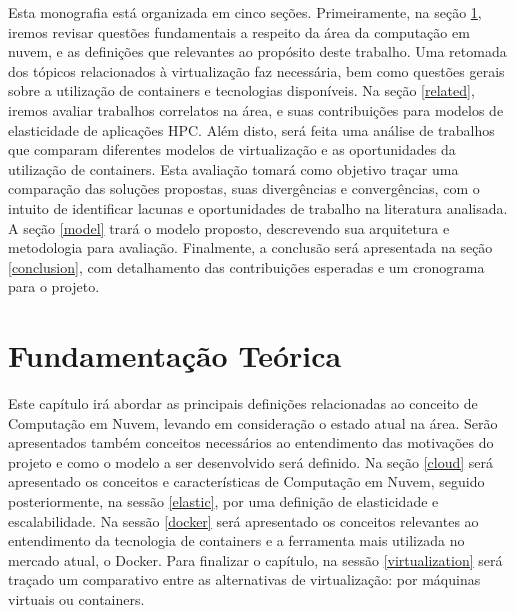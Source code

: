 \documentclass[twoside,english,brazilian]{UNISINOSartigo}
\begin{document}
Esta monografia está organizada em cinco seções. Primeiramente, na seção \ref{fundamentacao}, iremos revisar questões fundamentais a respeito da área da computação em nuvem, e as definições que relevantes ao propósito deste trabalho. Uma retomada dos tópicos relacionados à virtualização faz necessária, bem como questões gerais sobre a utilização de containers e tecnologias disponíveis. Na seção \ref{related}, iremos avaliar trabalhos correlatos na área, e suas contribuições para modelos de elasticidade de aplicações HPC. Além disto, será feita uma análise de trabalhos que comparam diferentes modelos de virtualização e as oportunidades da utilização de containers. Esta avaliação tomará como objetivo traçar uma comparação das soluções propostas, suas divergências e convergências, com o intuito de identificar lacunas e oportunidades
de trabalho na literatura analisada. A seção \ref{model} trará o modelo proposto, descrevendo sua arquitetura e metodologia para avaliação. Finalmente, a conclusão será apresentada na seção \ref{conclusion}, com detalhamento das contribuições esperadas e
um cronograma para o projeto.


\chapter{Fundamentação Teórica}
\label{fundamentacao}

Este capítulo irá abordar as principais definições relacionadas ao conceito de Computação em Nuvem, levando em consideração o estado atual na área. Serão apresentados também conceitos necessários ao entendimento das motivações do projeto e como o modelo a ser desenvolvido será definido. Na seção \ref{cloud} será apresentado os conceitos e características de Computação em Nuvem, seguido posteriormente, na sessão \ref{elastic}, por uma definição de elasticidade e escalabilidade. Na sessão \ref{docker} será apresentado os conceitos relevantes ao entendimento da tecnologia de containers e a ferramenta mais utilizada no mercado atual, o Docker. Para finalizar o capítulo, na sessão \ref{virtualization} será traçado um comparativo entre as alternativas de virtualização: por máquinas virtuais ou containers. 
\end{document}
